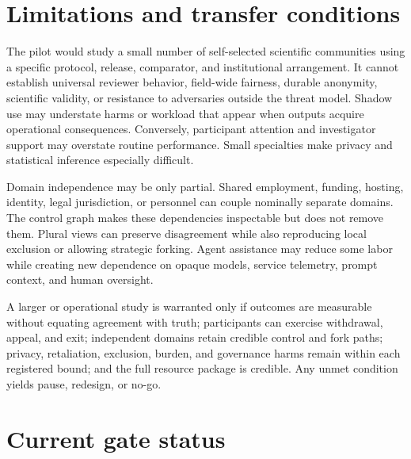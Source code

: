 \documentclass[11pt]{article}
\begin{document}
\section{Limitations and transfer conditions}

The pilot would study a small number of self-selected scientific communities using
a specific protocol, release, comparator, and institutional arrangement. It cannot
establish universal reviewer behavior, field-wide fairness, durable anonymity,
scientific validity, or resistance to adversaries outside the threat model. Shadow
use may understate harms or workload that appear when outputs acquire operational
consequences. Conversely, participant attention and investigator support may
overstate routine performance. Small specialties make privacy and statistical
inference especially difficult.

Domain independence may be only partial. Shared employment, funding, hosting,
identity, legal jurisdiction, or personnel can couple nominally separate domains.
The control graph makes these dependencies inspectable but does not remove them.
Plural views can preserve disagreement while also reproducing local exclusion or
allowing strategic forking. Agent assistance may reduce some labor while creating
new dependence on opaque models, service telemetry, prompt context, and human
oversight.

A larger or operational study is warranted only if outcomes are measurable without
equating agreement with truth; participants can exercise withdrawal, appeal, and
exit; independent domains retain credible control and fork paths; privacy,
retaliation, exclusion, burden, and governance harms remain within each registered
bound; and the full resource package is credible. Any unmet condition yields pause,
redesign, or no-go.

\section{Current gate status}
\end{document}
